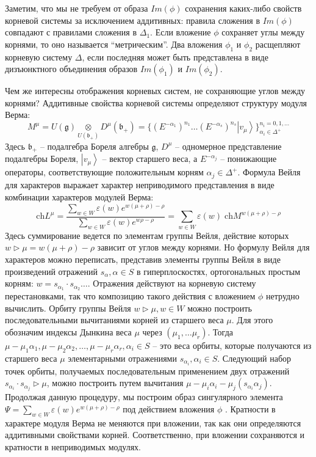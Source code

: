 \documentclass[12pt]{article}
\newcommand{\gf}{\mathfrak{g}}
\newcommand{\bff}{\mathfrak{b}}
\begin{document}
Заметим, что мы не требуем от образа $Im(\phi)$ сохранения каких-либо свойств корневой системы за исключением аддитивных:  
правила сложения в $Im(\phi)$ совпадают с правилами сложения в $\Delta_{1}$. Если вложение
$\phi$ сохраняет углы между корнями, то оно называется ``метрическим''. Два вложения $\phi_1$ и
$\phi_2$ расщепляют корневую систему $\Delta$, если последняя может быть представлена в виде
дизъюнктного объединения образов $Im(\phi_1)$ и $Im(\phi_2)$.

Чем же интересны отображения корневых систем, не сохраняющие углов между корнями? Аддитивные
свойства корневой системы определяют структуру модуля Верма:
    \begin{equation*}
      M^{\mu}=U(\gf)\underset{U(\bff_{+})}{\otimes} D^{\mu}(\bff_{+})=\{(E^{-\alpha_{1}})^{n_{1}}\dots (E^{-\alpha_{s}})^{n_{s}} \left|v_{\mu}\right>\}_{\alpha_{i}\in\Delta^{+}}^{n_{i}=0,1,\dots}
    \end{equation*}
Здесь $\bff_{+}$ -- подалгебра Бореля алгебры $\gf$, $D^{\mu}$ -- одномерное представление
подалгебры Бореля, $\left|v_{\mu}\right>$ -- вектор старшего веса, а  $E^{-\alpha_{j}}$ --
понижающие операторы, соответствующие положительным корням $\alpha_{j}\in \Delta^{+}$. 
Формула Вейля для характеров выражает характер неприводимого представления в виде комбинации характеров
модулей Верма: 
\begin{equation*}
  \mathrm{ch} L^{\mu}=\frac{\sum_{w\in W} \varepsilon(w) e^{w(\mu+\rho)-\rho}}{\sum_{w\in W}\varepsilon(w) e^{w\rho-\rho}}=\sum_{w\in W} \varepsilon(w)\; \mathrm{ch} M^{w(\mu+\rho)-\rho}
\end{equation*}
Здесь суммирование ведется по элементам группы Вейля, действие которых $w\triangleright \mu
=w(\mu+\rho)-\rho$ зависит от углов между корнями. Но формулу Вейля для характеров можно переписать,
представив элементы группы Вейля в виде произведений отражений $s_{\alpha}, \alpha \in S$ в
гиперплоскостях, ортогональных простым корням: $w=s_{\alpha_{1}}\cdot s_{\alpha_{2}}\dots$.
Отражения действуют на корневую систему перестановками, так что композицию такого действия с
вложением $\phi$ нетрудно вычислить. Орбиту группы Вейля $w\triangleright \mu, w\in W$ можно
построить последовательными вычитаниями корней из старшего веса $\mu$. Для этого обозначим индексы
Дынкина веса $\mu$ через $(\mu_{1},\dots \mu_{r})$. Тогда $\mu-\mu_{1}\alpha_{1},
\mu-\mu_{2}\alpha_{2},\dots, \mu-\mu_{r}\alpha_{r}, \alpha_{i}\in S$ -- это веса орбиты, которые
получаются из старшего веса $\mu$ элементарными отражениями $s_{\alpha_{i}}, \alpha_{i}\in S$.
Следующий набор точек орбиты, получаемых последовательным применением двух отражений
$s_{\alpha_{i}}\cdot s_{\alpha_{j}}\triangleright\mu$, можно построить путем вычитания
$\mu-\mu_{i}\alpha_{i}-\mu_{j} (s_{\alpha_{i}}\alpha_{j})$. Продолжая данную процедуру, мы построим
образ сингулярного элемента $\Psi=\sum_{w\in W} \varepsilon(w) e^{w(\mu+\rho)-\rho}$ под действием
вложения $\phi$ \cite{2011arXiv1111.6787L}. Кратности в характере модуля Верма не меняются при
вложении, так как они определяются аддитивными свойствами корней. Соответственно, при вложении
сохраняются и кратности в неприводимых модулях.
\end{document}
